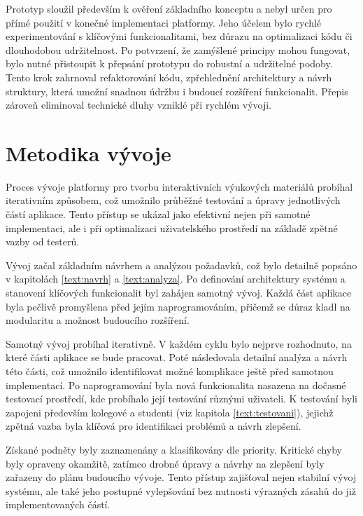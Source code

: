 Prototyp sloužil především k ověření základního konceptu a nebyl určen pro přímé použití v konečné implementaci platformy. 
Jeho účelem bylo rychlé experimentování s klíčovými funkcionalitami, bez důrazu na optimalizaci kódu či dlouhodobou udržitelnost. 
Po potvrzení, že zamýšlené principy mohou fungovat, bylo nutné přistoupit k přepsání prototypu do robustní a udržitelné podoby. 
Tento krok zahrnoval refaktorování kódu, zpřehlednění architektury a návrh struktury, která umožní snadnou údržbu i budoucí rozšíření funkcionalit. 
Přepis zároveň eliminoval technické dluhy vzniklé při rychlém vývoji.


\section{Metodika vývoje}\label{text:realizace/metodikaVyvoje}

Proces vývoje platformy pro tvorbu interaktivních výukových materiálů probíhal iterativním způsobem, což umožnilo průběžné testování a úpravy jednotlivých částí aplikace. 
Tento přístup se ukázal jako efektivní nejen při samotné implementaci, ale i při optimalizaci uživatelského prostředí na základě zpětné vazby od testerů.

Vývoj začal základním návrhem a analýzou požadavků, což bylo detailně popsáno v kapitolách \ref{text:navrh} a \ref{text:analyza}. 
Po definování architektury systému a stanovení klíčových funkcionalit byl zahájen samotný vývoj. 
Každá část aplikace byla pečlivě promyšlena před jejím naprogramováním, přičemž se důraz kladl na modularitu a možnost budoucího rozšíření.

Samotný vývoj probíhal iterativně. 
V každém cyklu bylo nejprve rozhodnuto, na které části aplikace se bude pracovat. 
Poté následovala detailní analýza a návrh této části, což umožnilo identifikovat možné komplikace ještě před samotnou implementací. 
Po naprogramování byla nová funkcionalita nasazena na dočasné testovací prostředí, kde probíhalo její testování různými uživateli. 
K testování byli zapojeni především kolegové a studenti (viz kapitola \ref{text:testovani}), jejichž zpětná vazba byla klíčová pro identifikaci problémů a návrh zlepšení.

Získané podněty byly zaznamenány a klasifikovány dle priority. 
Kritické chyby byly opraveny okamžitě, zatímco drobné úpravy a návrhy na zlepšení byly zařazeny do plánu budoucího vývoje. 
Tento přístup zajišťoval nejen stabilní vývoj systému, ale také jeho postupné vylepšování bez nutnosti výrazných zásahů do již implementovaných částí.

